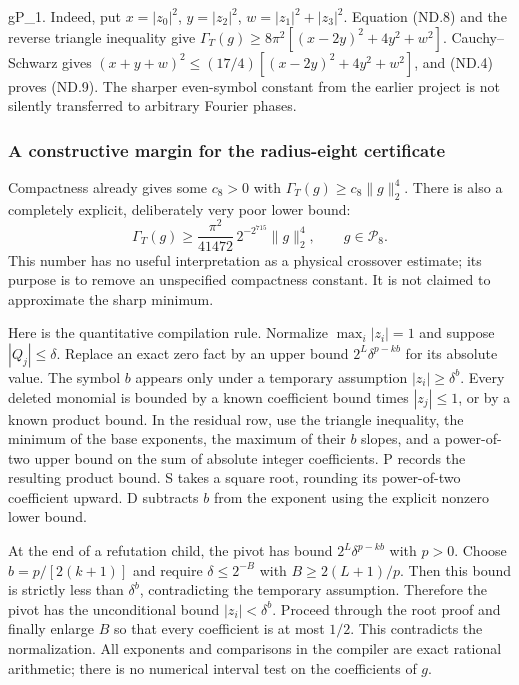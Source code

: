                          \qquad g\in\mathcal P_1.          
\] Indeed, put \(x=|z_0|^2\), \(y=|z_2|^2\), \(w=|z_1|^2+|z_3|^2\). Equation (ND.8) and the reverse triangle inequality give \(\Gamma_T(g)\geq8\pi^2[(x-2y)^2+4y^2+w^2]\). Cauchy--Schwarz gives \((x+y+w)^2\leq(17/4)[(x-2y)^2+4y^2+w^2]\), and (ND.4) proves (ND.9). The sharper even-symbol constant from the earlier project is not silently transferred to arbitrary Fourier phases.

\subsubsection{A constructive margin for the radius-eight certificate}\label{nondegeneracy:a-constructive-margin-for-the-radius-eight-certificate}

Compactness already gives some \(c_8>0\) with \(\Gamma_T(g)\geq c_8\|g\|_2^4\). There is also a completely explicit, deliberately very poor lower bound: \[
 \boxed{\displaystyle
 \Gamma_T(g)\geq \frac{\pi^2}{41472}\,2^{-2^{715}}\|g\|_2^4,
                         \qquad g\in\mathcal P_8.}          \tag{ND.10}
\] This number has no useful interpretation as a physical crossover estimate; its purpose is to remove an unspecified compactness constant. It is not claimed to approximate the sharp minimum.

Here is the quantitative compilation rule. Normalize \(\max_i|z_i|=1\) and suppose \(|Q_j|\leq\delta\). Replace an exact zero fact by an upper bound \(2^L\delta^{p-kb}\) for its absolute value. The symbol \(b\) appears only under a temporary assumption \(|z_i|\geq\delta^b\). Every deleted monomial is bounded by a known coefficient bound times \(|z_j|\leq1\), or by a known product bound. In the residual row, use the triangle inequality, the minimum of the base exponents, the maximum of their \(b\) slopes, and a power-of-two upper bound on the sum of absolute integer coefficients. P records the resulting product bound. S takes a square root, rounding its power-of-two coefficient upward. D subtracts \(b\) from the exponent using the explicit nonzero lower bound.

At the end of a refutation child, the pivot has bound \(2^L\delta^{p-kb}\) with \(p>0\). Choose \(b=p/[2(k+1)]\) and require \(\delta\leq2^{-B}\) with \(B\geq2(L+1)/p\). Then this bound is strictly less than \(\delta^b\), contradicting the temporary assumption. Therefore the pivot has the unconditional bound \(|z_i|<\delta^b\). Proceed through the root proof and finally enlarge \(B\) so that every coefficient is at most \(1/2\). This contradicts the normalization. All exponents and comparisons in the compiler are exact rational arithmetic; there is no numerical interval test on the coefficients of \(g\).

